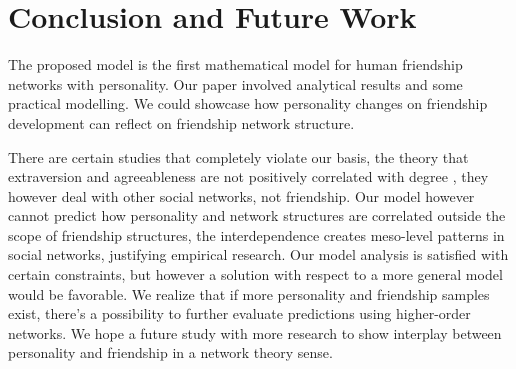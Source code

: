 \documentclass[runningheads]{llncs}
\begin{document}
\section{Conclusion and Future Work}
The proposed model is the first mathematical model for human friendship networks with personality. Our paper involved analytical results and some practical modelling. We could showcase how personality changes on friendship development can reflect on friendship network structure. 

There are certain studies that completely violate our basis, the theory that extraversion and agreeableness are not positively correlated with degree \cite{ref_27,ref_28,ref_29}, they however deal with other social networks, not friendship. Our model however cannot predict how personality and network structures are correlated outside the scope of friendship structures, the interdependence creates meso-level patterns in social networks, justifying empirical research. Our model analysis is satisfied with certain constraints, but however a solution with respect to a more general model would be favorable. We realize that if more personality and friendship samples exist, there’s a possibility to further evaluate predictions using higher-order networks. We hope a future study with more research to show interplay between personality and friendship in a network theory sense.
%
%
%
% 
% 
%
\end{document}
